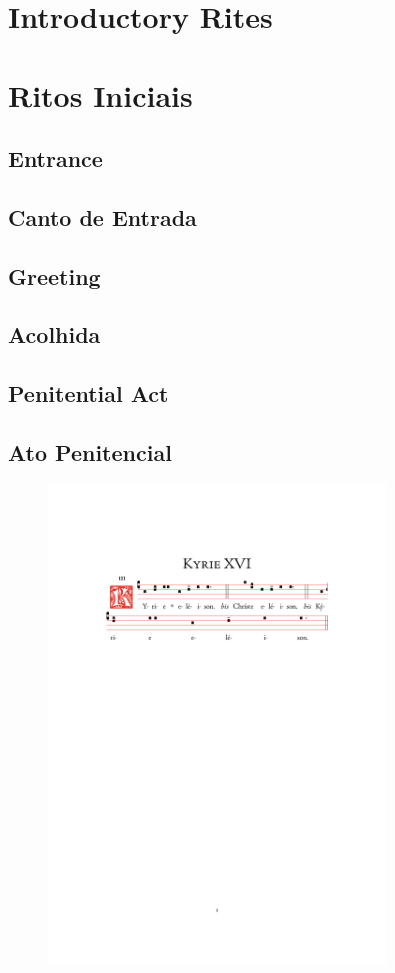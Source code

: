 \documentclass[10pt,a5]{article}
\newcommand \sect[2] {\section*{#1} \switchcolumn \section*{#2} \switchcolumn*}
\newcommand \subsect[2] {\subsection*{#1} \switchcolumn \subsection*{#2} \switchcolumn*}
\begin{document}
\massenglish




\begin{paracol}{2}

\sect{Introductory Rites}{Ritos Iniciais}

\subsect{Entrance}{Canto de Entrada}

\subsect{Greeting}{Acolhida}

\switchcolumn



\switchcolumn


\switchcolumn*

\subsect{Penitential Act}{Ato Penitencial}

\end{paracol}

\begin{figure}[h]
	\centering
	\includegraphics[trim = 35mm 200mm 35.5mm 45mm, clip, width = 0.8\textwidth]{scores/Kyrie-XVI.pdf}
\end{figure}
\end{document}
